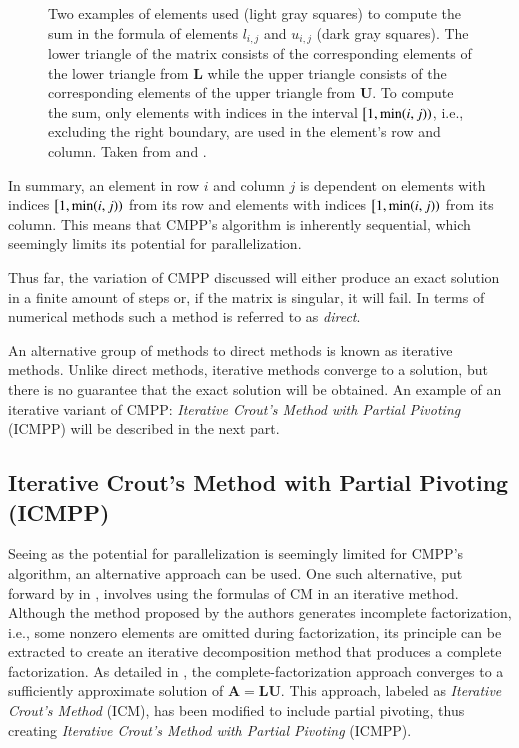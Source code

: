 \begin{figure}[ht!]
\begin{subfigure}{.5\textwidth}
		\label{Figure:theory->ICMPP->LUP->CMPP->sum-in-element-computation-dependance-U}
	\end{subfigure}
	\caption{Two examples of elements used (light gray squares) to compute the sum in the formula of elements $l_{i,j}$ and $u_{i,j}$ (dark gray squares).
		The lower triangle of the matrix consists of the corresponding elements of the lower triangle from $\mathbf{L}$ while the upper triangle consists of the corresponding elements of the upper triangle from $\mathbf{U}$.
		To compute the sum, only elements with indices in the interval $\left[1, \minp{i, j}\right)$, i.e., excluding the right boundary, are used in the element's row and column.
		Taken from  \cite{Cejka2022} and  \cite{Chow2015}.
		}
	\label{Figure:theory->ICMPP->LUP->CMPP->sum-in-element-computation-dependance}
\end{figure}

In summary, an element in row $i$ and column $j$ is dependent on elements with indices $\left[1, \minp{i, j}\right)$ from its row and elements with indices $\left[1, \minp{i, j}\right)$ from its column.
This means that CMPP's algorithm is inherently sequential, which seemingly limits its potential for parallelization.

Thus far, the variation of CMPP discussed will either produce an exact solution in a finite amount of steps or, if the matrix is singular, it will fail.
In terms of numerical methods such a method is referred to as \textit{direct}.

An alternative group of methods to direct methods is known as iterative methods.
Unlike direct methods, iterative methods converge to a solution, but there is no guarantee that the exact solution will be obtained.
An example of an iterative variant of CMPP: \textit{Iterative Crout's Method with Partial Pivoting} (ICMPP) will be described in the next part.

\subsection{Iterative Crout's Method with Partial Pivoting (ICMPP)}\label{Subsection:theory->ICMPP->LUP->ICMPP}
Seeing as the potential for parallelization is seemingly limited for CMPP's algorithm, an alternative approach can be used.
One such alternative, put forward by  in  \cite{Anzt2019}, involves using the formulas of CM in an iterative method.
Although the method proposed by the authors generates incomplete factorization, i.e., some nonzero elements are omitted during factorization, its principle can be extracted to create an iterative decomposition method that produces a complete factorization.
As detailed in  \cite{Cejka2022}, the complete-factorization approach converges to a sufficiently approximate solution of $\mathbf{A} = \mathbf{LU}$.
This approach, labeled as \textit{Iterative Crout's Method} (ICM), has been modified to include partial pivoting, thus creating \textit{Iterative Crout's Method with Partial Pivoting} (ICMPP).

